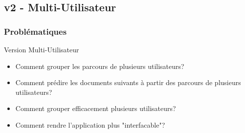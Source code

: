 \documentclass{beamer}
\begin{document}
        \subsection{v2 - Multi-Utilisateur}
            \begin{frame}
                \frametitle{Problématiques}
                Version Multi-Utilisateur
                \pause
                \begin{itemize}
                    \item Comment grouper les parcours de plusieurs utilisateurs?
                    \pause
                    \item Comment prédire les documents suivants à partir des parcours de plusieurs utilisateurs?
                    \pause
                    \item Comment grouper efficacement plusieurs utilisateurs?
                    \pause
                    \item Comment rendre l'application plus "interfacable"?
                \end{itemize}
            \end{frame}
\end{document}

